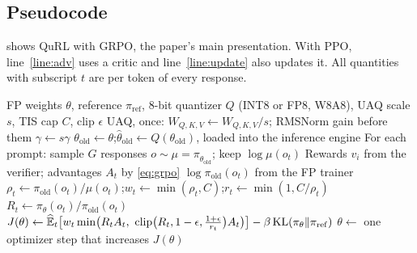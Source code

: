 \documentclass[11pt]{article}
\newcommand{\pold}{\pi_{\mathrm{old}}}
\newcommand{\thold}{\theta_{\mathrm{old}}}
\newcommand{\qthold}{\hat\theta_{\mathrm{old}}}
\newcommand{\Ehat}{\widehat{\mathbb E}}
\begin{document}
\subsection{Pseudocode}\label{sec:pseudocode}
 shows QuRL with GRPO, the paper's main presentation. With PPO, line~\ref{line:adv} uses a critic and line~\ref{line:update} also updates it. All quantities with subscript $t$ are per token of every response.

\begin{algorithm}[tb]
\caption{QuRL (one training run)}\label{alg:qurl}
\begin{algorithmic}[1]
\Require FP weights $\theta$, reference $\pi_{\mathrm{ref}}$, 8-bit quantizer $Q$ (INT8 or FP8, W8A8), UAQ scale $s$, TIS cap $C$, clip $\epsilon$
\State UAQ, once: $W_{Q,K,V}\gets W_{Q,K,V}/s$; RMSNorm gain before them $\gamma\gets s\gamma$ \label{line:uaq}
  \State $\thold\gets\theta$;\quad $\qthold\gets Q(\thold)$, loaded into the inference engine \label{line:quant}
  \State For each prompt: sample $G$ responses $o\sim\mu=\pi_{\qthold}$; keep $\log\mu(o_t)$ \label{line:rollout}
  \State Rewards $v_i$ from the verifier; advantages $A_t$ by \eqref{eq:grpo}\label{line:adv}
  \State $\log\pold(o_t)$ from the FP trainer \label{line:prox}
  \State $\rho_t\gets\pold(o_t)/\mu(o_t)$;\quad $w_t\gets\min(\rho_t,C)$;\quad $r_t\gets\min(1,C/\rho_t)$ \label{line:tis}
    \State $R_t\gets\pi_\theta(o_t)/\pold(o_t)$\label{line:ratio}
    \State $J(\theta)\gets\Ehat_t\bigl[w_t\min\bigl(R_tA_t,\ \clip\bigl(R_t,1-\epsilon,\tfrac{1+\epsilon}{r_t}\bigr)A_t\bigr)\bigr]-\beta\,\KL(\pi_\theta\|\pi_{\mathrm{ref}})$ \label{line:acr}
    \State $\theta\gets$ one optimizer step that increases $J(\theta)$\label{line:update}
  \EndFor
\EndFor
\end{algorithmic}
\end{algorithm}
\end{document}
